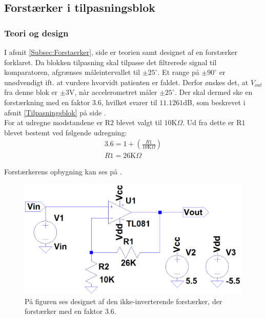 \subsection{Forstærker i tilpasningsblok}\label{Forstaerker_faktor3_afs}
\subsubsection{Teori og design}
I afsnit \ref{Subsec:Forstaerker}, side \pageref{Subsec:Forstaerker} er teorien samt designet af en forstærker forklaret. Da blokken tilpasning skal tilpasse det filtrerede signal til komparatoren, afgrænses måleintervallet til $\pm25^{\circ}$. Et range på $\pm90^{\circ}$ er unødvendigt ift. at vurdere hvorvidt patienten er faldet. Derfor ønskes det, at $V_{out}$ fra denne blok er $\pm3$V, når accelerometret måler $\pm25^{\circ}$. Der skal dermed ske en forstærkning med en faktor $3.6$, hvilket svarer til $11.1261$dB, som beskrevet i afsnit \ref{Tilpasningsblok} på side \pageref{Tilpasningsblok}. \\
For at udregne modstandene er R$2$ blevet valgt til $10$K$\Omega$. Ud fra dette er R$1$ blevet bestemt ved følgende udregning:
\begin{eqnarray}
3.6 = 1 + (\frac{R1}{10\text{K}\Omega}) \\
R1 = 26\text{K}\Omega
\end{eqnarray}

\noindent Forstærkerens opbygning kan ses på .
\begin{figure}[H]
	\centering
	\includegraphics[scale=0.35]{figures/cProblemloesning/Forstaerker_faktor3.PNG}
	\caption{På figuren ses designet af den ikke-inverterende forstærker, der forstærker med en faktor $3.6$.}
	\label{fig:Forstaerker_faktor3}
\end{figure}

